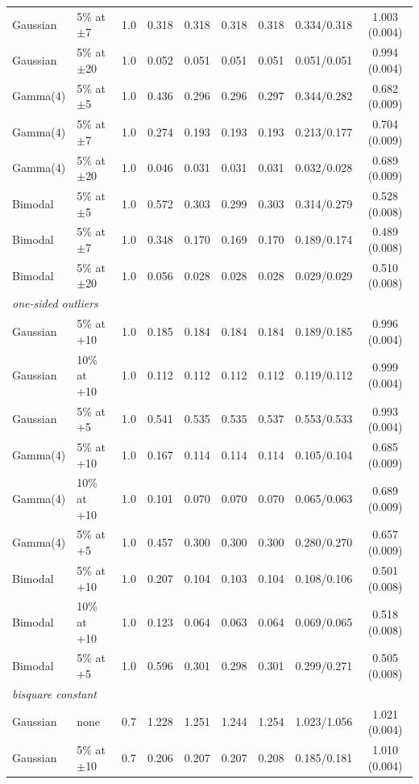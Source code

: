 \begin{tabular}{llccccccc}
Gaussian & 5\% at $\pm$7 & 1.0 & 0.318 & 0.318 & 0.318 & 0.318 & 0.334/0.318 & 1.003 (0.004) \\
Gaussian & 5\% at $\pm$20 & 1.0 & 0.052 & 0.051 & 0.051 & 0.051 & 0.051/0.051 & 0.994 (0.004) \\
Gamma(4) & 5\% at $\pm$5 & 1.0 & 0.436 & 0.296 & 0.296 & 0.297 & 0.344/0.282 & 0.682 (0.009) \\
Gamma(4) & 5\% at $\pm$7 & 1.0 & 0.274 & 0.193 & 0.193 & 0.193 & 0.213/0.177 & 0.704 (0.009) \\
Gamma(4) & 5\% at $\pm$20 & 1.0 & 0.046 & 0.031 & 0.031 & 0.031 & 0.032/0.028 & 0.689 (0.009) \\
Bimodal & 5\% at $\pm$5 & 1.0 & 0.572 & 0.303 & 0.299 & 0.303 & 0.314/0.279 & 0.528 (0.008) \\
Bimodal & 5\% at $\pm$7 & 1.0 & 0.348 & 0.170 & 0.169 & 0.170 & 0.189/0.174 & 0.489 (0.008) \\
Bimodal & 5\% at $\pm$20 & 1.0 & 0.056 & 0.028 & 0.028 & 0.028 & 0.029/0.029 & 0.510 (0.008) \\
\multicolumn{9}{l}{\emph{one-sided outliers}} \\
Gaussian & 5\% at +10 & 1.0 & 0.185 & 0.184 & 0.184 & 0.184 & 0.189/0.185 & 0.996 (0.004) \\
Gaussian & 10\% at +10 & 1.0 & 0.112 & 0.112 & 0.112 & 0.112 & 0.119/0.112 & 0.999 (0.004) \\
Gaussian & 5\% at +5 & 1.0 & 0.541 & 0.535 & 0.535 & 0.537 & 0.553/0.533 & 0.993 (0.004) \\
Gamma(4) & 5\% at +10 & 1.0 & 0.167 & 0.114 & 0.114 & 0.114 & 0.105/0.104 & 0.685 (0.009) \\
Gamma(4) & 10\% at +10 & 1.0 & 0.101 & 0.070 & 0.070 & 0.070 & 0.065/0.063 & 0.689 (0.009) \\
Gamma(4) & 5\% at +5 & 1.0 & 0.457 & 0.300 & 0.300 & 0.300 & 0.280/0.270 & 0.657 (0.009) \\
Bimodal & 5\% at +10 & 1.0 & 0.207 & 0.104 & 0.103 & 0.104 & 0.108/0.106 & 0.501 (0.008) \\
Bimodal & 10\% at +10 & 1.0 & 0.123 & 0.064 & 0.063 & 0.064 & 0.069/0.065 & 0.518 (0.008) \\
Bimodal & 5\% at +5 & 1.0 & 0.596 & 0.301 & 0.298 & 0.301 & 0.299/0.271 & 0.505 (0.008) \\
\multicolumn{9}{l}{\emph{bisquare constant}} \\
Gaussian & none & 0.7 & 1.228 & 1.251 & 1.244 & 1.254 & 1.023/1.056 & 1.021 (0.004) \\
Gaussian & 5\% at $\pm$10 & 0.7 & 0.206 & 0.207 & 0.207 & 0.208 & 0.185/0.181 & 1.010 (0.004) \\

\end{tabular}
